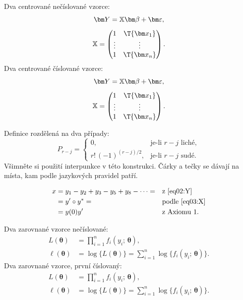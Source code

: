 Dva centrované nečíslované vzorce:
\begin{gather*}
\bm Y = \mathbb{X}\bm\beta + \bm\varepsilon, \\[1ex]
\mathbb{X} = \begin{pmatrix} 1 & \T{\bm x_1} \\ \vdots & \vdots \\ 1 &
  \T{\bm x_n} \end{pmatrix}.
\end{gather*}
Dva centrované číslované vzorce:
\begin{gather}
\bm Y = \mathbb{X}\bm\beta + \bm\varepsilon, \label{eq02:Y}\\[1ex]
\mathbb{X} = \begin{pmatrix} 1 & \T{\bm x_1} \label{eq03:X}\\ \vdots & \vdots \\ 1 &
  \T{\bm x_n} \end{pmatrix}.
\end{gather}

Definice rozdělená na dva případy:
\[
P_{r-j}=
\begin{cases}
0, & \text{je-li $r-j$ liché},\\
r!\,(-1)^{(r-j)/2}, & \text{je-li $r-j$ sudé}.
\end{cases}
\]
Všimněte si použití interpunkce v této konstrukci. Čárky a tečky se
dávají na místa, kam podle jazykových pravidel patří.

\begin{align}
x& = y_1-y_2+y_3-y_5+y_8-\dots = && \text{z \eqref{eq02:Y}} \nonumber\\
& = y'\circ y^* = && \text{podle \eqref{eq03:X}} \nonumber\\
& = y(0) y' && \text {z Axiomu 1.}
\end{align}


Dva zarovnané vzorce nečíslované:
\begin{align*}
L(\bm\theta) &= \prod_{i=1}^n f_i(y_i;\,\bm\theta), \\
\ell(\bm\theta) &= \log\bigl\{L(\bm\theta)\bigr\} =
\sum_{i=1}^n \log\bigl\{f_i(y_i;\,\bm\theta)\bigr\}.
\end{align*}
Dva zarovnané vzorce, první číslovaný:
\begin{align}
L(\bm\theta) &= \prod_{i=1}^n f_i(y_i;\,\bm\theta), \label{eq01:L} \\
\ell(\bm\theta) &= \log\bigl\{L(\bm\theta)\bigr\} =
\sum_{i=1}^n \log\bigl\{f_i(y_i;\,\bm\theta)\bigr\}. \nonumber
\end{align}

